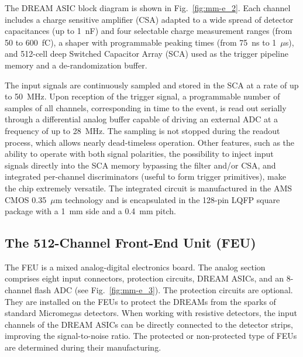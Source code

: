 The DREAM ASIC block diagram is shown in Fig.~\ref{fig:mm-e_2}. Each channel includes a charge sensitive amplifier 
(CSA) adapted to a wide spread of detector capacitances (up to 1~nF) and four selectable charge measurement ranges
(from 50 to 600~fC), a shaper with programmable peaking times (from 75~ns to 1~$\mu$s), and 512-cell deep Switched
Capacitor Array (SCA) used as the trigger pipeline memory and a de-randomization buffer.

The input signals are continuously sampled and stored in the SCA at a rate of up to 50~MHz. Upon reception of the trigger
signal, a programmable number of samples of all channels, corresponding in time to the event, is read out serially through
a differential analog buffer capable of driving an external ADC at a frequency of up to 28~MHz. The sampling is not
stopped during the readout process, which allows nearly dead-timeless operation. Other features, such as the ability to
operate with both signal polarities, the possibility to inject input signals directly into the SCA memory bypassing the filter
and/or CSA, and integrated per-channel discriminators (useful to form trigger primitives), make the chip extremely
versatile. The integrated circuit is manufactured in the AMS CMOS 0.35~$\mu$m technology and is encapsulated in the
128-pin LQFP square package with a 1~mm side and a 0.4~mm pitch.

\subsection{The 512-Channel Front-End Unit (FEU)}

The FEU is a mixed analog-digital electronics board. The analog section comprises eight input connectors, protection
circuits, DREAM ASICs, and an 8-channel flash ADC (see Fig.~\ref{fig:mm-e_3}). The protection circuits are optional.
They are installed on the FEUs to protect the DREAMs from the sparks of standard Micromegas detectors. When
working with resistive detectors, the input channels of the DREAM ASICs can be directly connected to the detector
strips, improving the signal-to-noise ratio. The protected or non-protected type of FEUs are determined during their
manufacturing.

